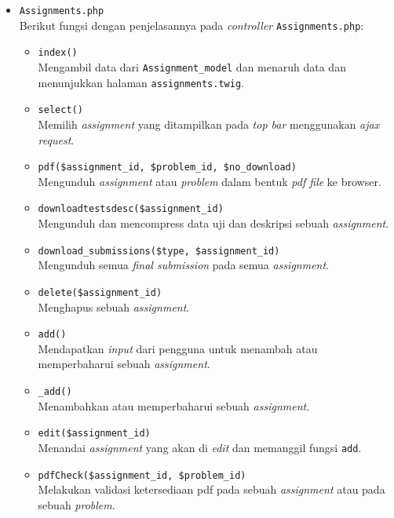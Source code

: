 \begin{itemize}
      \item \verb|Assignments.php| \\
            Berikut fungsi dengan penjelasannya pada \textit{controller} \verb|Assignments.php|:

            \begin{itemize}
                  \item \verb|index()| \\
                        Mengambil data dari \verb|Assignment_model| dan menaruh data dan menunjukkan halaman \verb|assignments.twig|.
                  \item \verb|select()| \\
                        Memilih \textit{assignment} yang ditampilkan pada \textit{top bar} menggunakan \textit{ajax request}.
                  \item \verb|pdf($assignment_id, $problem_id, $no_download)| \\
                        Mengunduh \textit{assignment} atau \textit{problem} dalam bentuk \textit{pdf file} ke browser.
                  \item \verb|downloadtestsdesc($assignment_id)| \\
                        Mengunduh dan mencompress data uji dan deskripsi sebuah \textit{assignment}.
                  \item \verb|download_submissions($type, $assignment_id)| \\
                        Mengunduh semua \textit{final submission} pada semua \textit{assignment}.
                  \item \verb|delete($assignment_id)| \\
                        Menghapus sebuah \textit{assignment}.
                  \item \verb|add()| \\
                        Mendapatkan \textit{input} dari pengguna untuk menambah atau memperbaharui sebuah \textit{assignment}.
                  \item \verb|_add()| \\
                        Menambahkan atau memperbaharui sebuah \textit{assignment}.
                  \item \verb|edit($assignment_id)| \\
                        Menandai \textit{assignment} yang akan di \textit{edit} dan memanggil fungsi \verb|add|.
                  \item \verb|pdfCheck($assignment_id, $problem_id)| \\
                        Melakukan validasi ketersediaan pdf pada sebuah \textit{assignment} atau pada sebuah \textit{problem}.
            \end{itemize}


\end{itemize}

